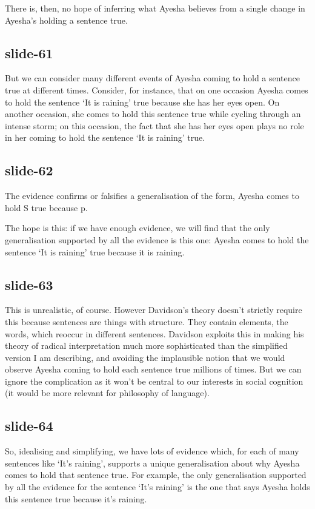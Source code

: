 \documentclass[12pt,\papersize]{extarticle}
\begin{document}
There is, then, no hope of inferring what Ayesha believes
from a single change in Ayesha’s holding a sentence true.

\subsection{slide-61}
But we can consider many different events of Ayesha coming to hold a sentence true
at different times.
Consider, for instance, that on one occasion Ayesha comes to hold the sentence ‘It is raining’
true because she has her eyes open.
On another occasion, she comes to hold this sentence true while cycling through
an intense storm; on this occasion, the fact that she has her eyes open plays no role
in her coming to hold the sentence ‘It is raining’ true.

\subsection{slide-62}
The evidence confirms or falsifies a generalisation of the form,
Ayesha comes to hold S true because p.

The hope is this: if we have enough evidence, we will find that
the only generalisation supported by all the evidence is this one:
Ayesha comes to hold the sentence ‘It is raining’ true because it is raining.

\subsection{slide-63}
This is unrealistic, of course.
However Davidson’s theory doesn’t strictly require this because sentences
are things with structure.  They contain elements, the words, which reoccur
in different sentences.
Davidson exploits this in making his theory of radical interpretation
much more sophisticated than the simplified version I am describing,
and avoiding the implausible notion that we would observe Ayesha coming to hold
each sentence true millions of times.
But we can ignore the complication as it won’t be central to our interests in
social cognition (it would be more relevant for philosophy of language).

\subsection{slide-64}
So, idealising and simplifying, we have lots of evidence which,
for each of many sentences like ‘It’s raining’, supports a unique
generalisation about why Ayesha comes to hold that sentence true.
For example, the only generalisation supported by all the evidence
for the sentence ‘It’s raining’ is the one that says Ayesha
holds this sentence true because it’s raining.
\end{document}
